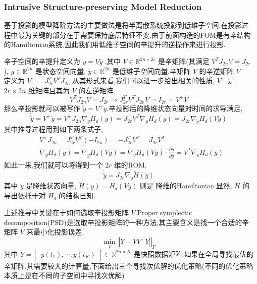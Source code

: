 \documentclass[11pt]{article}
\begin{document}
\subsubsection{Intrusive Structure-preserving Model Reduction}
\label{sec:orgddfc82a}
基于投影的模型降阶方法的主要做法是将半离散系统投影到低维子空间.在投影过程中最为关键的部分在于需要保持底层特征不变.由于前面构造的FOM是有辛结构的Hamiltonian系统,因此我们用低维子空间的辛提升的逆操作来进行投影.

辛子空间的辛提升定义为 \(y=V\tilde{y}\) ,其中 \(V\in\mathbb{R}^{2n\times2r}\) 是辛矩阵(其满足 \(V^TJ_{2n}V=J_{2r}\)), \(y\in \mathbb{R}^{2n}\) 是状态空间向量, \(\tilde{y}\in \mathbb{R}^{2n}\) 是低维子空间向量.辛矩阵 \(V\) 的辛逆矩阵 \(V^+\) 定义为 \(V^+=J_{2r}^TV^TJ_{2n}\).从其形式来看,我们可以进一步给出相关的性质, \(V^+\) 是 \(2r\times2n\) 维矩阵且其为 \(V\) 的左逆矩阵,
\begin{equation*}
V^TJ_{2n}V=J_{2r}\Rightarrow J_{2r}^TV^TJ_{2n}V=I_{2r}=V^+V
\end{equation*}
那么辛投影就可以被写作 \(\tilde{y}=V^+y\).辛投影后的降维状态向量对时间的求导满足,
\begin{equation*}
\dot{\tilde{y}}=V^+\dot{y}=V^+J_{2n}\nabla_yH_d(y)=J_{2r}V^T\nabla_yH_d(y)=J_{2r}\nabla_{\tilde{y}}H_d(V\tilde{y})
\end{equation*}
其中推导过程用到如下两条式子,
\begin{align*}
&V^+J_{2n}=J_{2r}^TV^T(-I_{2n})=-J_{2r}^TV^T=J_{2r}V^T\\
&\nabla_{\tilde{y}}H_d(y)=\nabla_{\tilde{y}}H_d(V\tilde{y})=\nabla_yH_d(V\tilde{y})\cdot \frac{\partial y}{\partial \tilde{y}}=V^T\nabla_yH_d(y)
\end{align*}
如此一来,我们就可以将得到一个 \(2r\) 维的ROM,
\begin{equation*}
\dot{\tilde{y}}=J_{2r}\nabla_{\tilde{y}}\tilde{H}(\tilde{y})
\end{equation*}
其中 \(\tilde{y}\) 是降维状态向量, \(\tilde{H}(\tilde{y})=H_d(V\tilde{y})\) 则是
降维的Hamiltonian.显然, \(\tilde{H}\) 的导出依托于对 \(H_d\) 的结构已知.

上述推导中关键在于如何选取辛投影矩阵 \(V\).Proper symplectic decomposition(PSD)是选取辛投影矩阵的一种方法,其主要含义是找一个合适的辛矩阵 \(V\) 来最小化投影误差,
\begin{equation*}
\min_V \left\Vert Y-VV^+Y\right\Vert_F
\end{equation*}
其中 \(Y=\begin{bmatrix}y(t_1),\cdots,y(t_K)\end{bmatrix}\in\mathbb{R}^{2n\times K}\) 是快照数据矩阵.如果在全局寻找最优的辛矩阵,其需要较大的计算量,下面给出三个寻找次优解的优化策略(不同的优化策略本质上是在不同的子空间中寻找次优解)
\end{document}
